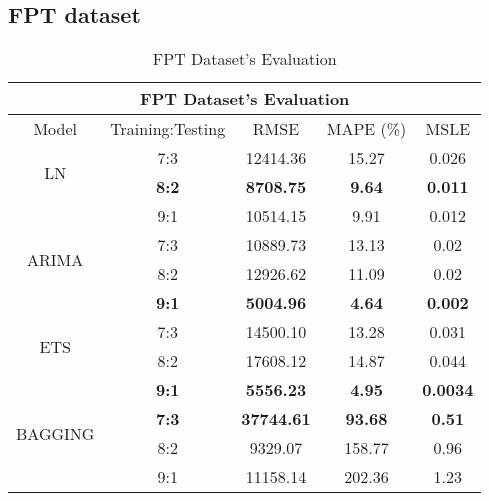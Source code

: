 \documentclass{ieeeojies}
\begin{document}
\subsection{FPT dataset} 
\begin{table}[H]
    \centering
    \begin{tabular}{|c|c|c|c|c|}
         \hline
         \multicolumn{5}{|c|}{\textbf{FPT Dataset's Evaluation}}\\
         \hline
         \centering Model & Training:Testing & RMSE & MAPE (\%) & MSLE\\
         \hline
         \multirow{2}{*}{LN} & 7:3 & 12414.36 & 15.27 & 0.026\\ & \textbf{8:2} & \textbf{8708.75} &\textbf{9.64} & \textbf{0.011} \\ & 9:1 & 10514.15 & 9.91 & 0.012\\
         \hline
         \multirow{2}{*}{ARIMA} & 7:3 &  10889.73 &  13.13 & 0.02 \\ & 8:2 &  12926.62 & 11.09 &  0.02\\ & \textbf{9:1} & \textbf{5004.96} & \textbf{4.64} & \textbf{0.002}\\
         \hline
         \multirow{2}{*}{ETS} & 7:3 & 14500.10 & 13.28 &0.031 \\ & 8:2  & 17608.12 &14.87 & 0.044\\ & \textbf{9:1} &  	\textbf{5556.23} &	\textbf{4.95} & 	\textbf{0.0034} \\
         \hline
          \multirow{2}{*}{BAGGING} & \textbf{7:3} & \textbf{37744.61} & \textbf{93.68} & \textbf{0.51} \\ & 8:2  &   9329.07 &158.77 & 0.96 \\ & 9:1 &  11158.14 &	202.36 & 1.23 \\
         \hline
    \end{tabular}
    \caption{FPT Dataset's Evaluation}
    \label{vcbresult}
\end{table}
\end{document}
